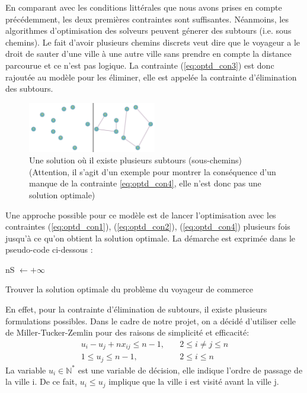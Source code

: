 \documentclass{article}
\begin{document}
En comparant avec les conditions littérales que nous avons prises en compte précédemment, les deux premières contraintes sont suffisantes. Néanmoins, les algorithmes d'optimisation des solveurs peuvent génerer des subtours (i.e. sous chemins). Le fait d'avoir plusieurs chemins discrets veut dire que le voyageur a le droit de sauter d'une ville à une autre ville sans prendre en compte la distance parcourue et ce n'est pas logique. La contrainte (\ref{eq:optd_con3}) est donc rajoutée au modèle pour les éliminer, elle est appelée la contrainte d'élimination des subtours.\\

\begin{figure}[h]\centering
\includegraphics[width=0.5\textwidth]{graphe_avec_subtour}
\caption{Une solution où il existe plusieurs subtours (sous-chemins) (Attention, il s'agit d'un exemple pour montrer la conséquence d'un manque de la contrainte \ref{eq:optd_con4}, elle n'est donc pas une solution optimale)}

\end{figure}
Une approche possible pour ce modèle est de lancer l'optimisation avec les contraintes (\ref{eq:optd_con1}), (\ref{eq:optd_con2}), (\ref{eq:optd_con4}) plusieurs fois jusqu'à ce qu'on obtient la solution optimale. La démarche est exprimée dans le pseudo-code ci-dessous :\\
\begin{algorithm}[H] 
   nS \(\leftarrow +\infty\)  \;
 \caption{Trouver la solution optimale du problème du voyageur de commerce}
\end{algorithm}
En effet, pour la contrainte d'élimination de subtours, il existe plusieurs formulations possibles. Dans le cadre de notre projet, on a décidé d'utiliser celle de Miller-Tucker-Zemlin pour des raisons de simplicité et efficacité:
\begin{equation}
\begin{aligned}
	u_i - u_j + nx_{ij} \leq n - 1, \quad & 2 \leq i \neq j \leq n \\
	1 \leq u_j \leq n - 1, \quad & 2 \leq i \leq n
\end{aligned}
\end{equation}
La variable \(u_i \in \mathbb{N}^{*}\) est une variable de décision, elle indique l'ordre de passage de la ville i. De ce fait, \(u_i \leq u_j\) implique que la ville i est visité avant la ville j.\\
\end{document}
